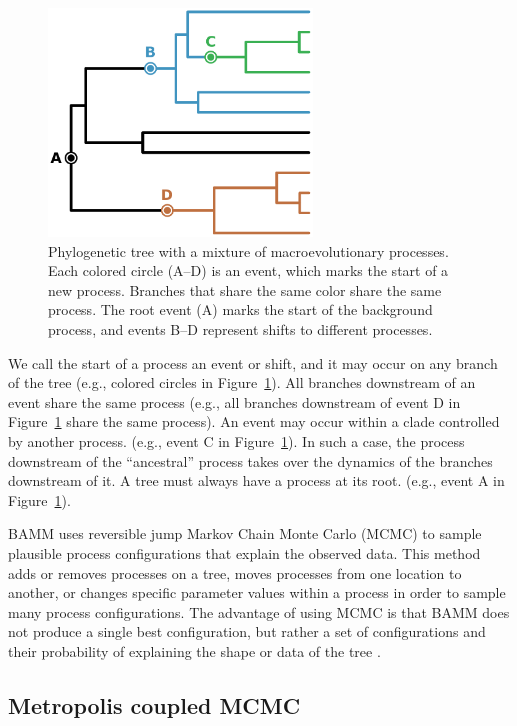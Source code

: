 \documentclass[12pt]{article}
\begin{document}
\begin{figure}
\begin{center}
\includegraphics[width=7cm]{tree.pdf}
\end{center}
\caption{Phylogenetic tree with a mixture of macroevolutionary processes.
    Each colored circle (A--D) is an event,
    which marks the start of a new process.
    Branches that share the same color share the same process.
    The root event (A) marks the start of the background process,
    and events B--D represent shifts to different processes.}
\label{fig:tree}
\end{figure}


We call the start of a process an event or shift,
and it may occur on any branch of the tree
(e.g., colored circles in Figure~\ref{fig:tree}).
%
All branches downstream of an event share the same process
(e.g., all branches downstream of event D
in Figure~\ref{fig:tree} share the same process).
%
An event may occur within a clade controlled by another process.
(e.g., event C in Figure~\ref{fig:tree}).
%
In such a case, the process downstream of the ``ancestral'' process
takes over the dynamics of the branches downstream of it.
%
A tree must always have a process at its root.
(e.g., event A in Figure~\ref{fig:tree}).


BAMM uses reversible jump Markov Chain Monte Carlo (MCMC)
to sample plausible process configurations that explain the observed data.
%
This method adds or removes processes on a tree,
moves processes from one location to another,
or changes specific parameter values within a process
in order to sample many process configurations.
%
The advantage of using MCMC
is that BAMM does not produce a single best configuration,
but rather a set of configurations and their probability
of explaining the shape or data of the tree \citep{rab14plos}.


\subsection*{Metropolis coupled MCMC}
\end{document}
